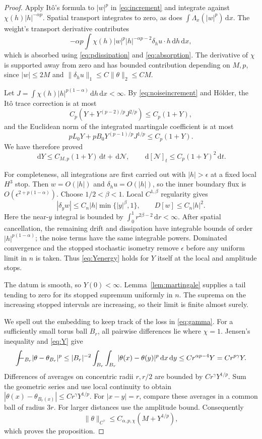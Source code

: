 \documentclass[11pt]{amsart}
\theoremstyle{remark}
\numberwithin{equation}{section}
\newcommand{\dd}{\,\mathrm d}
\newcommand{\norm}[1]{\lVert#1\rVert}
\newcommand{\fint}{\mathchoice{\displaystyle\int\!\!\!\!-}{\int\!\!\!-}{\int\!-}{\int\!-}}
\begin{document}
\begin{proof}
Apply It\^o's formula to $|w|^p$ in \eqref{eq:increment} and integrate against
$\chi(h)|h|^{-\alpha p}$. Spatial transport integrates to zero, as does
$\int\Lambda_x(|w|^p)\dd x$. The weight's transport derivative contributes
\[
 -\alpha p\int\chi(h)|w|^p|h|^{-\alpha p-2}\delta_hu\cdot h\dd h\dd x,
\]
which is absorbed using \eqref{eq:pdissipation} and \eqref{eq:absorption}.
The derivative of $\chi$ is supported away from zero and has bounded
contribution depending on $M,p$, since $|w|\leq2M$ and
$\norm{\delta_hu}_1\leq C\norm{\theta}_2\leq CM$.

Let $J=\int\chi(h)|h|^{p(1-\alpha)}\dd h\dd x<\infty$.
By \eqref{eq:noiseincrement} and H\"older, the It\^o trace correction is
at most
\[
 C_p\left(Y+Y^{(p-2)/p}J^{2/p}\right)\leq C_p(1+Y),
\]
and the Euclidean norm of the integrated martingale coefficient is at most
\[
 pL_0Y+pB_0Y^{(p-1)/p}J^{1/p}\leq C_p(1+Y).
\]
We have therefore proved
\begin{equation}\label{eq:Yenergy}
 \dd Y\leq C_{M,p}(1+Y)\dd t+\dd\mathcal N,
 \qquad\dd[\mathcal N]_t\leq C_p(1+Y)^2\dd t.
\end{equation}

For completeness, all integrations are first carried out with $|h|>\epsilon$
at a fixed local $H^3$ stop. Then $w=O(|h|)$ and $\delta_hu=O(|h|)$,
so the inner boundary flux is $O(\epsilon^{2+p(1-\alpha)})$.
Choose $1/2<\beta<1$. Local $C^{1,\beta}$ regularity gives
\[
 |\delta_yw|\leq C_n|h|\min\{|y|^\beta,1\},\qquad D[w]\leq C_n|h|^2.
\]
Here the near-$y$ integral is bounded by
$\int_0^1 r^{2\beta-2}\dd r<\infty$. After spatial cancellation, the
remaining drift and dissipation have integrable bounds of order
$|h|^{p(1-\alpha)}$; the noise terms have the same integrable powers.
Dominated convergence and the stopped stochastic isometry remove $\epsilon$
before any uniform limit in $n$ is taken. Thus \eqref{eq:Yenergy} holds for
$Y$ itself at the local and amplitude stops.

The datum is smooth, so $Y(0)<\infty$. Lemma~\ref{lem:martingale} supplies
a tail tending to zero for its stopped supremum uniformly in $n$. The
suprema on the increasing stopped intervals are increasing, so their limit
is finite almost surely.

We spell out the embedding to keep track of the loss in \eqref{eq:gamma}.
For a sufficiently small torus ball $B_r$, all pairwise differences lie where
$\chi=1$. Jensen's inequality and \eqref{eq:Y} give
\[
 \fint_{B_r}|\theta-\theta_{B_r}|^p
 \leq |B_r|^{-2}\int_{B_r}\int_{B_r}|\theta(x)-\theta(y)|^p\dd x\dd y
 \leq C r^{\alpha p-4}Y=C r^{p\gamma}Y.
\]
Differences of averages on concentric radii $r,r/2$ are bounded by
$Cr^\gamma Y^{1/p}$. Sum the geometric series and use local continuity to
obtain $|\theta(x)-\theta_{B_r(x)}|\leq Cr^\gamma Y^{1/p}$.
For $|x-y|=r$, compare these averages in a common ball of radius $3r$.
For larger distances use the amplitude bound. Consequently
\begin{equation}\label{eq:holderembedding}
 \norm{\theta}_{C^\gamma}\leq C_{\alpha,p,\chi}(M+Y^{1/p}),
\end{equation}
which proves the proposition.
\end{proof}
\end{document}
